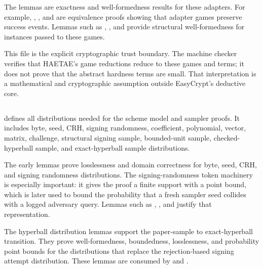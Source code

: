 The lemmas are exactness and well-formedness results for these adapters.  For
example, ,
, and
 are equivalence proofs showing
that adapter games preserve success events.  Lemmas such as
, , and
 provide structural well-formedness for
instances passed to these games.

This file is the explicit cryptographic trust boundary.  The machine checker
verifies that HAETAE's game reductions reduce to these games and terms; it does
not prove that the abstract hardness terms are small.  That interpretation is a
mathematical and cryptographic assumption outside EasyCrypt's deductive core.

\subsection[HAETAE\_Distributions.ec]{\texorpdfstring{}{HAETAE\_Distributions.ec}}

 defines all distributions needed for the
scheme model and sampler proofs.  It includes byte, seed, CRH, signing
randomness, coefficient, polynomial, vector, matrix, challenge, structural
signing sample, bounded-unit sample, checked-hyperball sample, and
exact-hyperball sample distributions.

The early lemmas prove losslessness and domain correctness for byte, seed, CRH,
and signing randomness distributions.  The signing-randomness token machinery is
especially important: it gives the proof a finite support with a point bound,
which is later used to bound the probability that a fresh sampler seed collides
with a logged adversary query.  Lemmas such as
,
, and
 justify that representation.

The hyperball distribution lemmas support the paper-sample to exact-hyperball
transition.  They prove well-formedness, boundedness, losslessness, and
probability point bounds for the distributions that replace the rejection-based
signing attempt distribution.  These lemmas are consumed by
 and .

\subsection[HAETAE\_Rejection.ec]{\texorpdfstring{}{HAETAE\_Rejection.ec}}

